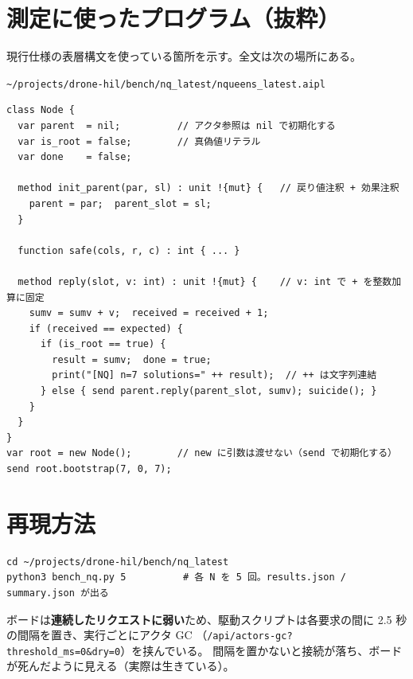 \documentclass[11pt,a4paper]{ltjsarticle}
\newcommand{\code}[1]{\texttt{\small #1}}
\begin{document}
\section{測定に使ったプログラム（抜粋）}

現行仕様の表層構文を使っている箇所を示す。全文は次の場所にある。

\begin{center}
\code{\~{}/projects/drone-hil/bench/nq\_latest/nqueens\_latest.aipl}
\end{center}

\begin{lstlisting}
class Node {
  var parent  = nil;          // アクタ参照は nil で初期化する
  var is_root = false;        // 真偽値リテラル
  var done    = false;

  method init_parent(par, sl) : unit !{mut} {   // 戻り値注釈 + 効果注釈
    parent = par;  parent_slot = sl;
  }

  function safe(cols, r, c) : int { ... }

  method reply(slot, v: int) : unit !{mut} {    // v: int で + を整数加算に固定
    sumv = sumv + v;  received = received + 1;
    if (received == expected) {
      if (is_root == true) {
        result = sumv;  done = true;
        print("[NQ] n=7 solutions=" ++ result);  // ++ は文字列連結
      } else { send parent.reply(parent_slot, sumv); suicide(); }
    }
  }
}
var root = new Node();        // new に引数は渡せない（send で初期化する）
send root.bootstrap(7, 0, 7);
\end{lstlisting}

\section{再現方法}

\begin{lstlisting}
cd ~/projects/drone-hil/bench/nq_latest
python3 bench_nq.py 5          # 各 N を 5 回。results.json / summary.json が出る
\end{lstlisting}

\noindent
ボードは\textbf{連続したリクエストに弱い}ため、駆動スクリプトは各要求の間に
2.5 秒の間隔を置き、実行ごとにアクタ GC
（\code{/api/actors-gc?threshold\_ms=0\&dry=0}）を挟んでいる。
間隔を置かないと接続が落ち、ボードが死んだように見える（実際は生きている）。
\end{document}

